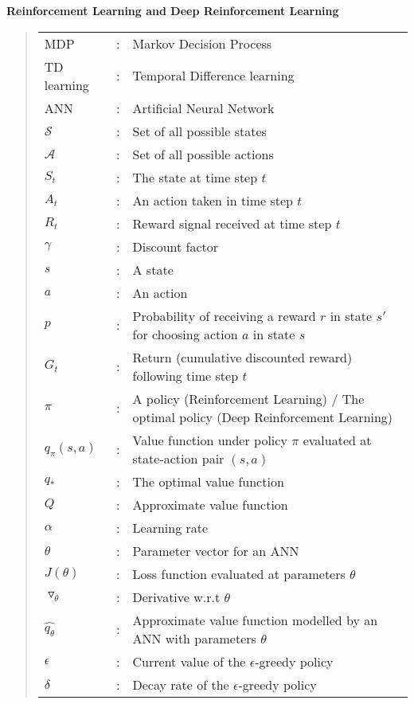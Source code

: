 \documentclass[../dissertation.tex]{subfiles}
\begin{document}
\noindent
\textbf{Reinforcement Learning and Deep Reinforcement Learning}
\begin{quote}
\noindent
\begin{tabular}{lcl}

MDP  &: & Markov Decision Process\\
TD learning    &:    & Temporal Difference learning\\
ANN  &: & Artificial Neural Network\\
$\mathcal{S}$ &: & Set of all possible states\\
$\mathcal{A}$ &: & Set of all possible actions\\
$S_t$ &: & The state at time step $t$\\
$A_t$ &: & An action taken in time step $t$\\
$R_t$ &: & Reward signal received at time step $t$\\
$\gamma$ &: & Discount factor\\
$s$ &: & A state\\
$a$ &: & An action\\
$p$ &: & Probability of receiving a reward $r$ in state $s'$ for choosing action $a$ in state $s$\\
$G_t$ &: & Return (cumulative discounted reward) following time step $t$\\
$\pi$ &: & A policy (Reinforcement Learning) / The optimal policy (Deep Reinforcement Learning)\\
$q_\pi(s,a)$ &: & Value function under policy $\pi$ evaluated at state-action pair $(s,a)$\\
$q_*$ &: & The optimal value function\\
$Q$ &: & Approximate value function\\
$\alpha$ &: & Learning rate\\
$\theta$ &: & Parameter vector for an ANN\\
$J(\theta)$ &: & Loss function evaluated at parameters $\theta$\\
$\triangledown_\theta$ &: & Derivative w.r.t $\theta$\\
$\hat{q_\theta}$ &: & Approximate value function modelled by an ANN with parameters $\theta$\\
$\epsilon$ &: & Current value of the $\epsilon$-greedy policy\\
$\delta$ &: & Decay rate of the $\epsilon$-greedy policy\\

\end{tabular}
\end{quote}
\end{document}
